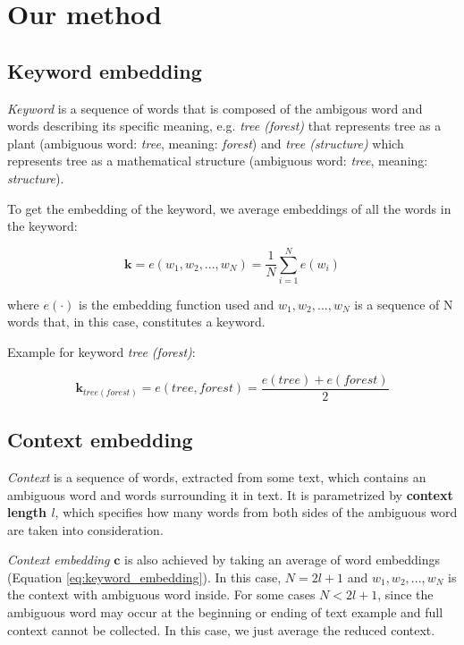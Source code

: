 \documentclass{llncs}
\begin{document}
\section{Our method}
\subsection{Keyword embedding}
\label{sec:kw_embed}
\textit{Keyword} is a sequence of words that is composed of the ambigous word and words describing its specific meaning, e.g. \textit{tree (forest)} that represents tree as a plant (ambiguous word: \textit{tree}, meaning: \textit{forest}) and \textit{tree (structure)} which represents tree as a mathematical structure (ambiguous word: \textit{tree}, meaning: \textit{structure}).

To get the embedding of the keyword, we average embeddings of all the words in the keyword:

\begin{equation}
    \label{eq:keyword_embedding}
    \bm{k} = e(w_1, w_2, ..., w_N) = \frac{1}{N}\sum_{i=1}^{N} e(w_i)
\end{equation}

where \(e(\cdot)\) is the embedding function used and \(w_1, w_2, ..., w_N\) is a sequence of N words that, in this case, constitutes a keyword.

Example for keyword \textit{tree (forest)}:

\begin{equation}
    \label{eq:example_kw_embed}
    \bm{k}_{tree (forest)} = e(tree, forest) = \frac{e(tree) + e(forest)}{2}
\end{equation}

\subsection{Context embedding}
\label{sec:ctx_embed}
\textit{Context} is a sequence of words, extracted from some text, which contains an ambiguous word and words surrounding it in text.
It is parametrized by \textbf{context length \(l\)}, which specifies how many words from both sides of the ambiguous word are taken into consideration.

\textit{Context embedding} \(\bm{c}\) is also achieved by taking an average of word embeddings (Equation \ref{eq:keyword_embedding}).
In this case, \(N = 2l + 1\) and \(w_1, w_2, ..., w_N\) is the context with ambiguous word inside. For some cases \(N < 2l + 1\), since the ambiguous word may occur at the beginning or ending of text example and full context cannot be collected.
In this case, we just average the reduced context.
\end{document}
